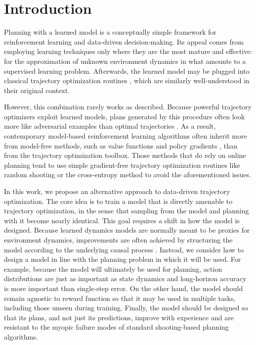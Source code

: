 \section{Introduction}
\label{sec:intro}

Planning with a learned model is a conceptually simple framework for reinforcement learning and data-driven decision-making.
Its appeal comes from employing learning techniques only where they are the most mature and effective: for the approximation of unknown environment dynamics in what amounts to a supervised learning problem.
Afterwards, the learned model may be plugged into classical trajectory optimization routines \cite{tassa2012synthesis,posa2014direct,matthew2017trajectory},
which are similarly well-understood in their original context.
\vspace{1em}



However, this combination rarely works as described.
Because powerful trajectory optimizers exploit learned models, plans generated by this procedure often look more like adversarial examples than optimal trajectories \cite{talvitie2014hallcuinated,ke2018modeling}.
As a result, contemporary model-based reinforcement learning algorithms often inherit more from model-free methods, such as value functions and policy gradients \cite{wang2019benchmarking}, than from the trajectory optimization toolbox.
Those methods that do rely on online planning tend to use simple gradient-free trajectory optimization routines like random shooting \cite{nagabandi2018mbmf} or the cross-entropy method \cite{botev2013cem,chua2018pets} to avoid the aforementioned issues.

In this work, we propose an alternative approach to data-driven trajectory optimization.
The core idea is to train a model that is directly amenable to trajectory optimization, in the sense that sampling from the model and planning with it become nearly identical.
This goal requires a shift in how the model is designed.
Because learned dynamics models are normally meant to be proxies
for environment dynamics, improvements are often achieved by structuring the model according to the underlying causal process \cite{bapst2019structured}.
Instead, we consider how to design a model in line with the planning problem in which it will be used.
For example, because the model will ultimately be used for planning, action distributions are just as important as state dynamics and long-horizon accuracy is more important than single-step error.
On the other hand, the model should remain agnostic to reward function so that it may be used in multiple tasks, including those unseen during training.
Finally, the model should be designed so that its plans, and not just its predictions, improve with experience and are resistant to the myopic failure modes of standard shooting-based planning algorithms.

